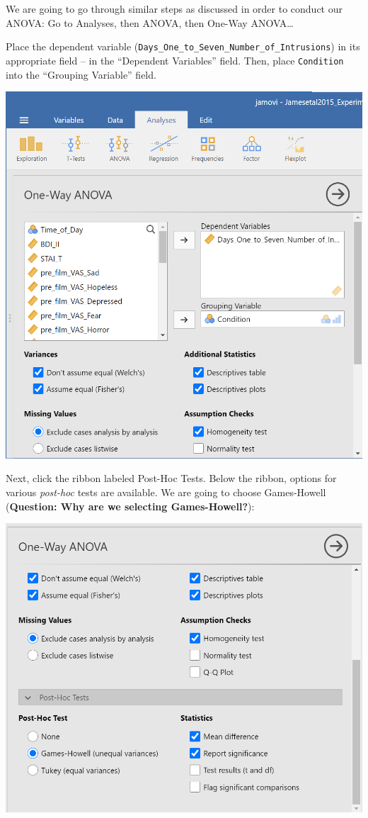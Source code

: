 \documentclass[
]{book}
\begin{document}
We are going to go through similar steps as discussed in order to conduct our ANOVA: Go to {Analyses}, then {ANOVA}, then {One-Way ANOVA\ldots{}}

Place the dependent variable (\texttt{Days\_One\_to\_Seven\_Number\_of\_Intrusions}) in its appropriate field -- in the ``Dependent Variables'' field. Then, place \texttt{Condition} into the ``Grouping Variable'' field.

\includegraphics{img/OneWayANOVACommands_BeforeFollowUps.png}

Next, click the ribbon labeled {Post-Hoc Tests}. Below the ribbon, options for various \emph{post-hoc} tests are available. We are going to choose {Games-Howell} (\textbf{Question: Why are we selecting Games-Howell?}):

\includegraphics{img/OneWayANOVAPostHocCommands.png}
\end{document}
